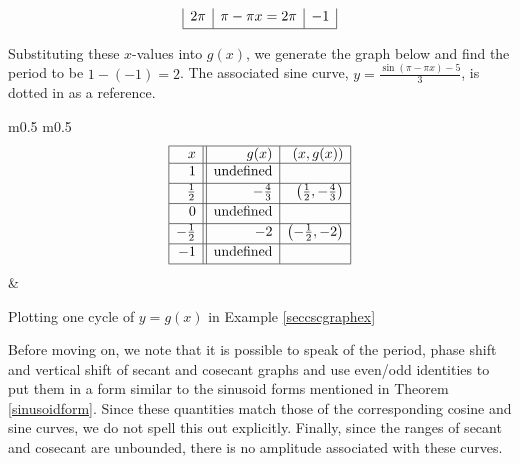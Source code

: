 {\begin{enumerate}
{\[\begin{array}{|r|r|r|}
2\pi  & \pi - \pi x = 2\pi & -1 \\  [2pt] \hline
\end{array} \]
\setlength{\extrarowheight}{0pt}}

Substituting these $x$-values into $g(x)$, we generate the graph below and find the period to be $1 - (-1) = 2$.   The associated sine curve, $y = \frac{\sin(\pi - \pi x) - 5}{3}$, is dotted in as a reference.  

\medskip

\noindent\hskip-30pt\begin{minipage}{\textwidth}
\begin{center}
\begin{tabular}{ m{} m{}}
\setlength{\extrarowheight}{2pt}
\[ \begin{array}{|r||r|r|}  

\hline

 x & g(x) & (x,g(x))  \\ \hline
1  & \text{undefined} &   \\ [2pt]   \hline
\frac{1}{2}  & -\frac{4}{3} &  \left(\frac{1}{2}, -\frac{4}{3} \right)  \\ [2pt] \hline 
0 & \text{undefined} &   \\ [2pt] \hline 
-\frac{1}{2} & -2 & \left(-\frac{1}{2}, -2\right)  \\ [2pt] \hline 
-1 & \text{undefined} &    \\ [2pt] \hline 
\end{array} \] \setlength{\extrarowheight}{0pt} & 

\end{tabular}
\end{center}
\captionsetup{type=figure}
\caption{Plotting one cycle of $y=g(x)$ in Example \ref{seccscgraphex}}
\end{minipage}

\end{enumerate}
}

\medskip

Before moving on, we note that it is possible to speak of the period, phase shift and vertical shift of secant and cosecant graphs and use even/odd identities to put them in a form similar to the sinusoid forms mentioned in Theorem \ref{sinusoidform}.  Since these quantities match those of the corresponding cosine and sine curves, we do not spell this out explicitly.  Finally, since the ranges of secant and cosecant are unbounded, there is no amplitude associated with these curves.


